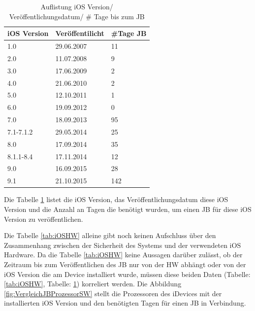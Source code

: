\begin{table}[htp!]
    \begin{center}
        \begin{tabular}{|l|l|l|} \hline
         \textbf{iOS Version} & \textbf{Veröffentilicht} & \textbf{\#Tage JB}\\ \hline    
        1.0 & 29.06.2007 & 11\\ \hline 
        2.0 & 11.07.2008	& 9\\ \hline 
        3.0 & 17.06.2009	& 2\\ \hline 
        4.0 & 21.06.2010 & 2\\ \hline 
        5.0 & 12.10.2011	& 1\\ \hline 
        6.0 & 19.09.2012	& 0\\ \hline 
        7.0 & 18.09.2013	& 95\\ \hline 
        7.1-7.1.2 & 29.05.2014 & 25\\ \hline 
        8.0 & 17.09.2014	& 35\\ \hline 
        8.1.1-8.4 & 17.11.2014	& 12\\ \hline 
        9.0 & 16.09.2015	& 28\\ \hline
        9.1 & 21.10.2015	& 142\\ \hline 
        \end{tabular} 
        \caption{Auflistung iOS Version/ Veröffentlichungsdatum/ \# Tage bis zum JB}
        \label{tab:iOSVersion}
    \end{center}
\end{table}
Die Tabelle \ref{tab:iOSVersion} listet die iOS Version, das Veröffentlichungsdatum diese iOS Version und die Anzahl an Tagen die benötigt wurden, um einen JB für diese iOS Version zu veröffentlichen.

Die Tabelle \ref{tab:iOSHW} alleine gibt noch keinen Aufschluss über den Zusammenhang zwischen der Sicherheit des Systems und der verwendeten iOS Hardware. Da die Tabelle \ref{tab:iOSHW} keine Aussagen darüber zulässt, ob der Zeitraum bis zum Veröffentlichen des JB nur von der HW abhängt oder von der iOS Version die am Device installiert wurde, müssen diese beiden Daten (Tabelle: \ref{tab:iOSHW}, Tabelle: \ref{tab:iOSVersion}) korreliert werden. Die Abbildung \ref{fig:VergleichJBProzessorSW} stellt die Prozessoren des iDevices mit der installierten iOS Version und den benötigten Tagen für einen JB in Verbindung. \par
    
